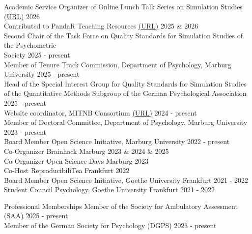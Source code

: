 \documentclass{resume} %
\begin{document}
\begin{rSection}{Academic Service}
Organizer of Online Lunch Talk Series on Simulation Studies \href{https://bsiepe.github.io/simulation-talk-series/}{\textcolor{linkblue}{(URL)}} \hfill 2026 \\
Contributed to PandaR Teaching Resources \href{https://pandar.netlify.app/authors/bjorn-siepe/}{\textcolor{linkblue}{(URL)}} \hfill 2025 \& 2026 \\
Second Chair of the Task Force on Quality Standards for Simulation Studies of the Psychometric\\ Society \hfill 2025 - present \\
Member of Tenure Track Commission, Department of Psychology, Marburg University \hfill 2025 - present \\
Head of the Special Interest Group for Quality Standards for Simulation Studies of the Quantitative Methods Subgroup of the German Psychological Association \hfill 2025 - present\\
Website coordinator, MITNB Consortium \href{https://mitnb.org}{\textcolor{linkblue}{(URL)}} \hfill 2024 - present\\
Member of Doctoral Committee, Department of Psychology, Marburg University \hfill 2023 - present\\
Board Member Open Science Initiative, Marburg University \hfill 2022 - present \\
Co-Organizer Brainhack Marburg \hfill 2023 \& 2024 \& 2025 \\
Co-Organizer Open Science Days Marburg \hfill 2023 \\
Co-Host ReproducibiliTea Frankfurt \hfill 2022 \\
Board Member Open Science Initiative, Goethe University Frankfurt \hfill 2021 - 2022 \\
Student Council Psychology, Goethe University Frankfurt \hfill 2021 - 2022
\end{rSection}


\begin{rSection}{Professional Memberships}
Member of the Society for Ambulatory Assessment (SAA) \hfill 2025 - present \\
Member of the German Society for Psychology (DGPS) \hfill 2023 - present 
\end{rSection}
\end{document}
